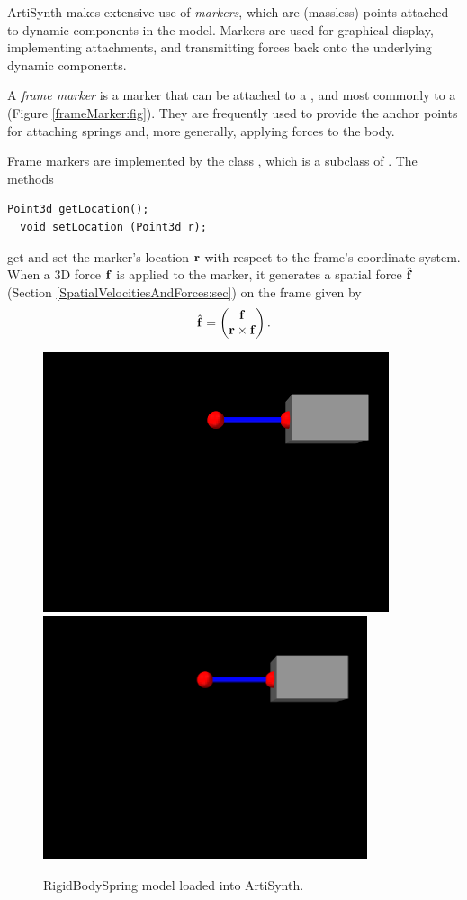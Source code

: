 ArtiSynth makes extensive use of {\it markers}, which are (massless)
points attached to dynamic components in the model. Markers are used
for graphical display, implementing attachments, and transmitting
forces back onto the underlying dynamic components.

A {\it frame marker} is a marker that can be attached to a
, and most commonly to a
 (Figure
\ref{frameMarker:fig}). They are frequently used to provide the
anchor points for attaching springs and, more generally, applying
forces to the body.

Frame markers are implemented by the class
, which
is a subclass of
.
The methods
%
\begin{lstlisting}[]
  Point3d getLocation();
  void setLocation (Point3d r);
\end{lstlisting}
%
get and set the marker's location ${\bf r}$ with respect to the frame's
coordinate system. When a 3D force ${\bf f}$ is applied to the marker, it
generates a spatial force $\hat{{\bf f}}$ (Section
\ref{SpatialVelocitiesAndForces:sec}) on the frame given by
%
\begin{equation}
\hat{{\bf f}} = \left(\begin{matrix} {\bf f} \\ {\bf r} \times {\bf f} \end{matrix}\right).
\end{equation}
%

\begin{figure}[ht]
\begin{center}
\iflatexml
 \includegraphics[]{images/RigidBodySpring}
\else
 \includegraphics[width=3.75in]{images/RigidBodySpring}
\fi
\end{center}
\caption{RigidBodySpring model loaded into ArtiSynth.}
\label{RigidBodySpring:fig}
\end{figure}

